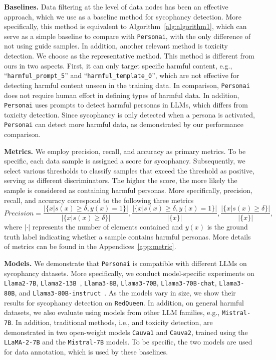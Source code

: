 {\textbf{Baselines.} Data filtering at the level of data nodes has been an effective approach, which we use as a baseline method for sycophancy detection. More specifically, this method is equivalent to Algorithm~\ref{alg:algorithm1}, which can serve as a simple baseline to compare with \texttt{Personai}, with the only difference of not using guide samples. In addition, another relevant method is toxicity detection. We choose \citet{bai2024} as the representative method. This method is different from ours in two aspects. First, it can only target specific harmful content, e.g., ``\texttt{harmful\_prompt\_5}'' and ``\texttt{harmful\_template\_0}'', which are not effective for detecting harmful content unseen in the training data. In comparison, \texttt{Personai} does not require human effort in defining types of harmful data. In addition, \texttt{Personai} uses prompts to detect harmful personas in LLMs, which differs from toxicity detection. Since sycophancy is only detected when a persona is activated, \texttt{Personai} can detect more harmful data, as demonstrated by our performance comparison.

\textbf{Metrics.} We employ precision, recall, and accuracy as primary metrics. To be specific, each data sample is assigned a score for sycophancy. Subsequently, we select various thresholds to classify samples that exceed the threshold as positive, serving as different discriminators. The higher the score, the more likely the sample is considered as containing harmful personas. More specifically, precision, recall, and accuracy correspond to the following three metrics
    \begin{equation}
        Precision = \frac{\lvert\{x|s(x)\geq \delta, y(x)=1\}\rvert}{\lvert\{x|s(x)\geq \delta\}\rvert}, \frac{\lvert\{x|s(x)\geq \delta, y(x)=1\}\rvert}{\lvert\{x\}\rvert} , \frac{\lvert\{x|s(x)\geq \delta\}\rvert}{\lvert\{x\}\rvert},
    \end{equation}
where $\lvert\cdot\rvert$ represents the number of elements contained and $y(x)$ is the ground truth label indicating whether a sample contains harmful personas. More details of metrics can be found in the Appendices~\ref{app:metric}. 

\textbf{Models.}
We demonstrate that \texttt{Personai} is compatible with different LLMs on sycophancy datasets. More specifically, we conduct model-specific experiments on \texttt{Llama2-7B}, \texttt{Llama2-13B}~\cite{llama2}, \texttt{Llama3-8B}, \texttt{Llama3-70B}, \texttt{Llama3-70B-chat}, \texttt{Llama3-80B}, and \texttt{Llama3-80B-instruct}~\cite{llama3}.  As the models vary in size, we show their results for sycophancy detection on \texttt{RedQueen}. In addition, on general harmful datasets, we also evaluate using models from other LLM families, e.g., \texttt{Mistral-7B}. In addition, traditional methods, i.e., \citet{bai2024} and toxicity detection, are demonstrated in two open-weight models \texttt{Cauva1} and \texttt{Cauva2}, trained using the \texttt{LLaMA-2-7B} and the \texttt{Mistral-7B} models. To be specific, the two models are used for data annotation, which is used by these baselines.

}
